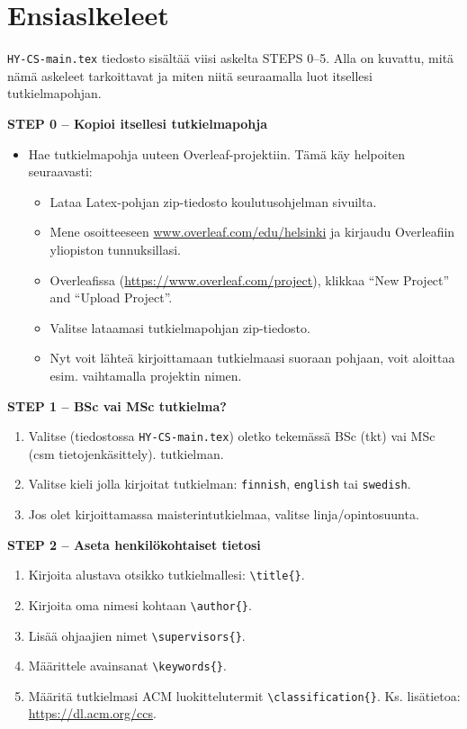 
\label{appendix:instructions_finnish}

\section{Ensiaslkeleet}

\texttt{HY-CS-main.tex} tiedosto sisältää viisi askelta STEPS 0--5. Alla on kuvattu, mitä nämä askeleet tarkoittavat ja miten niitä seuraamalla luot itsellesi tutkielmapohjan.
\vspace{0.5cm}

\textbf{STEP 0 -- Kopioi itsellesi tutkielmapohja}

\begin{itemize}
\item Hae tutkielmapohja uuteen Overleaf-projektiin. Tämä käy helpoiten seuraavasti:
\begin{itemize}
    \item Lataa Latex-pohjan zip-tiedosto koulutusohjelman sivuilta.
    \item Mene osoitteeseen \url{www.overleaf.com/edu/helsinki} ja kirjaudu Overleafiin yli\-opiston tunnuksillasi.
    \item Overleafissa (\url{https://www.overleaf.com/project}), klikkaa ``New Project'' and ``Upload Project''.
    \item Valitse lataamasi tutkielmapohjan zip-tiedosto.
    \item Nyt voit lähteä kirjoittamaan tutkielmaasi suoraan pohjaan, voit aloittaa esim. vaihtamalla projektin nimen.
\end{itemize}
\end{itemize}


{\textbf{STEP 1 -- BSc vai MSc tutkielma?}}
\begin{enumerate}
\item Valitse (tiedostossa \texttt{HY-CS-main.tex}) oletko tekemässä BSc (tkt) vai MSc (csm tietojenkäsittely).
tutkielman.
\item Valitse kieli jolla kirjoitat tutkielman: \texttt{finnish}, \texttt{english} tai \texttt{swedish}.
\item Jos olet kirjoittamassa maisterintutkielmaa, valitse linja/opintosuunta.
\end{enumerate}


{\textbf{STEP 2 -- Aseta henkilökohtaiset tietosi}}

\begin{enumerate}
\item Kirjoita alustava otsikko tutkielmallesi: \texttt{\textbackslash title\{\}}.
\item Kirjoita oma nimesi kohtaan \texttt{\textbackslash author\{\}}.
\item Lisää ohjaajien nimet \texttt{\textbackslash supervisors\{\}}.
\item Määrittele avainsanat \texttt{\textbackslash keywords\{\}}.
\item Määritä tutkielmasi ACM luokittelutermit \texttt{\textbackslash classification\{\}}. Ks. lisätietoa: \url{https://dl.acm.org/ccs}.
\end{enumerate}

